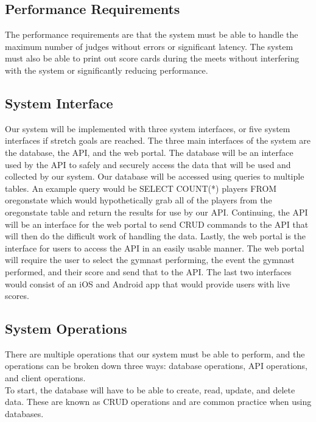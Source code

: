 \documentclass[letterpaper,10pt,draftclsnofoot,onecolumn,]{article}
\begin{document}
\subsection{Performance Requirements}
The performance requirements are that the system must be able to handle the maximum number of judges without errors or significant latency. The system must also be able to print out score cards during the meets without interfering with the system or significantly reducing performance.

\subsection{System Interface}
Our system will be implemented with three system interfaces, or five system interfaces if stretch goals are reached. The three main interfaces of the system are the database, the API, and the web portal. The database will be an interface used by the API to safely and securely access the data that will be used and collected by our system. Our database will be accessed using queries to multiple tables. An example query would be {\selectfont SELECT COUNT(*) players FROM oregonstate} which would hypothetically grab all of the players from the oregonstate table and return the results for use by our API. Continuing, the API will be an interface for the web portal to send CRUD commands to the API that will then do the difficult work of handling the data. Lastly, the web portal is the interface for users to access the API in an easily usable manner. The web portal will require the user to select the gymnast performing, the event the gymnast performed, and their score and send that to the API. The last two interfaces would consist of an iOS and Android app that would provide users with live scores.

\subsection{System Operations}
There are multiple operations that our system must be able to perform, and the operations can be broken down three ways: database operations, API operations, and client operations. \\

\noindent To start, the database will have to be able to create, read, update, and delete data. These are known as CRUD operations and are common practice when using databases. \\
\end{document}
